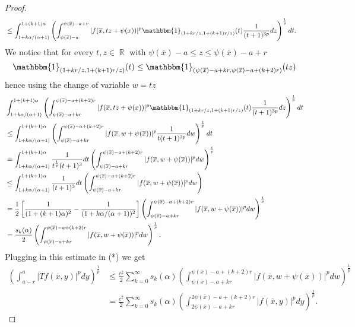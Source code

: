 \documentclass[12pt]{article}
\theoremstyle{definition}
\DeclareMathOperator\rr{\mathbb{R}}
\begin{document}
\begin{proof}
\begin{align*}
  &\le \int_{1+k\alpha/(\alpha+1)}^{1+(k+1)\alpha} \left ( \int_{\psi(\overline x) -a}^{\psi(\overline x) -a+r}|f(\overline x, tz+\psi(x))|^p\mathbbm{1}_{(1+kr/z,  1+(k+1)r/z ) }(t)\frac{1}{(t+1)^{3p}} dz \right) ^{\frac{1}{p}}dt.  
 \end{align*}
 We notice that for every $t,z \in \rr$ with $\psi(\overline x) -a \le z \le \psi(\overline x)-a+r$
 \[ \mathbbm{1}_{(1+kr/z,  1+(k+1)r/z ) }(t) \le \mathbbm{1}_{(\psi(\overline x)-a+kr, \psi(\overline x) - a+(k+2)r)}(tz)   \]
 hence using the change of variable $w=tz$
 \begin{align*}
 &\int_{1+k\alpha/(\alpha+1)}^{1+(k+1)\alpha} \left ( \int_{\psi(\overline x)-a+kr}^{\psi(\overline x)-a+(k+2)r}|f(\overline x, tz+\psi(x))|^p\mathbbm{1}_{(1+kr/z,  1+(k+1)r/z ) }(t)\frac{1}{(t+1)^{3p}} dz \right) ^{\frac{1}{p}}dt \\
&\le \int_{1+k\alpha/(\alpha+1)}^{1+(k+1)\alpha} \left ( \int_{\psi(\overline x)-a+kr}^{\psi(\overline x)-a+(k+2)r}|f(\overline x, w+\psi(\overline x))|^p \frac{1}{t(t+1)^{3p}} dw \right) ^{\frac{1}{p}}dt\\
&=\int_{1+k\alpha/(\alpha+1)}^{1+(k+1)\alpha}\frac{1}{t^{\frac{1}{p}}(t+1)^{3}}dt \left ( \int_{\psi(\overline x)-a+kr}^{\psi(\overline x)-a+(k+2)r}|f(\overline x, w+\psi(\overline x))|^p  dw \right) ^{\frac{1}{p}}\\
&\le \int_{1+k\alpha/(\alpha+1)}^{1+(k+1)\alpha}\frac{1}{(t+1)^{3}}dt \left ( \int_{\psi(\overline x)-a+kr}^{\psi(\overline x)-a+(k+2)r}|f(\overline x, w+\psi(\overline x))|^p  dw \right)\\
&= \frac{1}{2}\left[\frac{1}{(1+(k+1)\alpha)^2}-\frac{1}{(1+k\alpha/(\alpha+1))^2}\right] \left ( \int_{\psi(\overline x)-a+kr}^{\psi(\overline x)-a+(k+2)r}|f(\overline x, w+\psi(\overline x))|^p  dw \right) ^{\frac{1}{p}}\\
&=\frac{s_k(\alpha)}{2} \left ( \int_{\psi(\overline x)-a+kr}^{\psi(\overline x)-a+(k+2)r}|f(\overline x, w+\psi(\overline x))|^p  dw \right) ^{\frac{1}{p}}.
\end{align*}
Plugging in this estimate in (*) we get
\begin{align*}
 \left(\int_{a-r}^{a}|Tf(\overline x,y)|^p dy\right)^{\frac{1}{p}} &\le \frac{c^2}{2} \sum_{k=0}^\infty s_k(\alpha) \left ( \int_{\psi(\overline x) -a+kr}^{\psi(\overline x) -a+(k+2)r}|f(\overline x, w+\psi(\overline x))|^p  dw \right) ^{\frac{1}{p}} \\
&=\frac{c^2}{2} \sum_{k=0}^\infty s_k(\alpha) \left ( \int_{2\psi(\overline x) -a+kr}^{2\psi(\overline x) -a+(k+2)r}|f(\overline x, y)|^p  dy \right) ^{\frac{1}{p}}.

\end{align*}
\end{proof}
\end{document}
